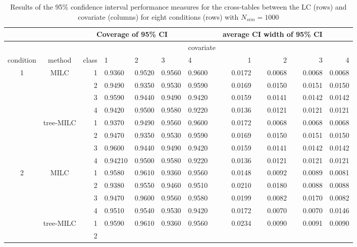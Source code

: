 \documentclass[a4paper, 11pt]{article} %
\begin{document}
\newpage
\begin{table}[ht]
\centering
\scriptsize
\caption{Results of the 95\% confidence interval performance measures for the cross-tables between the LC (rows) and covariate (columns) for eight conditions (rows) with $N_{sim}=1000$}
\label{COVresultsCI}
\begin{tabular}{cc r llll  rrrr }
  \hline
&&\multicolumn{4}{c}{Coverage of 95\% CI}&&\multicolumn{3}{c}{average CI width of 95\% CI}\\ 
 \hline
   &  &          &&&&  covariate  &&&\\
   \hline
   condition & method & class      & 1&2&3&4  &      1&2&3&4 \\ 

   \hline
  \multirow{8}{*}{1}
   & \multirow{4}{*}{MILC}
&  1 
& 0.9360 & 0.9520 & 0.9560 & 0.9600 
& 0.0172 & 0.0068 & 0.0068 & 0.0068 \\ 
 && 2 
 & 0.9490 & 0.9350 & 0.9530 & 0.9590 
 & 0.0169 & 0.0150 & 0.0151 & 0.0150 \\ 
   &&3 
& 0.9590 & 0.9440 & 0.9490 & 0.9420
 & 0.0159 & 0.0141 & 0.0142 & 0.0142 \\
  &&4  
 & 0.9420 & 0.9500 & 0.9580 & 0.9220
 & 0.0136 & 0.0121 & 0.0121 & 0.0121 \\ 
 \cline{2-11}
   &\multirow{4}{*}{tree-MILC}
&  1 
& 0.9370 & 0.9490 & 0.9560 & 0.9600 
& 0.0172 & 0.0068 & 0.0068 & 0.0068 \\  
 && 2 
 & 0.9470 & 0.9350 & 0.9530 & 0.9590 
& 0.0169 & 0.0150 & 0.0151 & 0.0150 \\ 
   &&3 
& 0.9600 & 0.9440 & 0.9490 & 0.9420
 & 0.0159 & 0.0141 & 0.0142 & 0.0142 \\
  &&4  
 & 0.94210 & 0.9500 & 0.9580 & 0.9220
 & 0.0136 & 0.0121 & 0.0121 & 0.0121 \\
    \hline
    \hline
  \multirow{8}{*}{2}
   & \multirow{4}{*}{MILC}
 &  1 
& 0.9580 & 0.9610 & 0.9360 & 0.9560
 & 0.0148 & 0.0092 & 0.0089 & 0.0081 \\ 
 && 2 
&  0.9380 & 0.9550 & 0.9460 & 0.9510 
 & 0.0210 & 0.0180 & 0.0088 & 0.0088 \\
   &&3 
  & 0.9470 & 0.9600 & 0.9560 & 0.9580
& 0.0199 & 0.0082 & 0.0170 & 0.0082 \\  
  &&4  
 & 0.9510 & 0.9540 & 0.9530 & 0.9420 
& 0.0172 & 0.0070 & 0.0070 & 0.0146 \\ 
 \cline{2-11}
   &\multirow{4}{*}{tree-MILC}
 &  1 
& 0.9590 & 0.9610 & 0.9360 & 0.9560
& 0.0234 & 0.0090 & 0.0091 & 0.0090 \\ 
 && 2 

\end{tabular}
\end{table}
\end{document}
